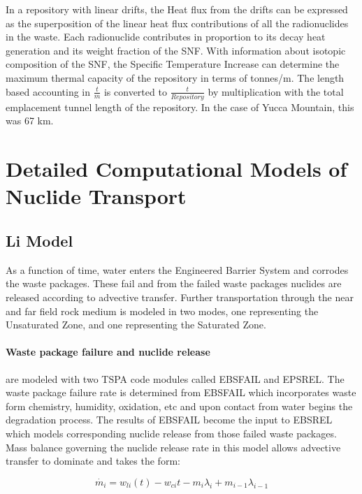 In a repository with linear drifts, the Heat flux from the drifts can be
expressed as the superposition of the linear heat flux contributions of all the
radionuclides in the waste. Each radionuclide contributes in proportion to its
decay heat generation and its weight fraction of the SNF. With information
about isotopic composition of the SNF, the Specific Temperature Increase can
determine the maximum thermal capacity of the repository in terms of tonnes/m.
The length based accounting in $\frac{t}{m}$ is converted to
$\frac{t}{Repository}$ by multiplication with the total emplacement tunnel
length of the repository.  In the case of Yucca Mountain, this was 67 km.

\section{Detailed Computational Models of Nuclide Transport}
\label{sec:detailed_nuclide}


\subsection{Li Model\cite{li_methodology_2006}} As a function of time, water
enters the Engineered Barrier System and corrodes the waste packages.  These
fail and from the failed waste packages nuclides are released according to
advective transfer.  Further transportation through the near and far field rock
medium is modeled in two modes, one representing the Unsaturated Zone, and one
representing the Saturated Zone.

\paragraph{Waste package failure and nuclide release} are modeled with two TSPA
code modules called EBSFAIL and EPSREL. The waste package failure rate is
determined from EBSFAIL which incorporates waste form chemistry, humidity,
oxidation, etc and upon contact from water begins the degradation process. The
results of EBSFAIL become the input to EBSREL which models corresponding
nuclide release from those failed waste packages. Mass balance governing the
nuclide release rate in this model allows advective transfer to dominate and
takes the form:

\begin{equation}
\dot{m_i}=w_{li}(t)-w_{ci}{t}-m_i\lambda_i+m_{i-1}\lambda_{i-1}\nonumber
\end{equation}

